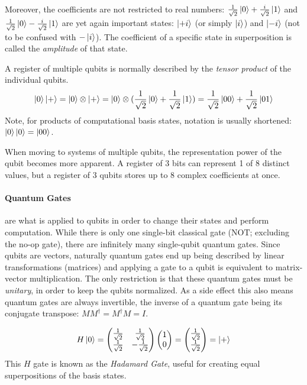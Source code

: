 Moreover, the coefficients are not restricted to real numbers: $\frac{1}{\sqrt2}\ket{0} + \frac{i}{\sqrt2}\ket{1}$ and $\frac{1}{\sqrt2}\ket{0} - \frac{i}{\sqrt2}\ket{1}$
are yet again important states: $\ket{+i}$ (or simply $\ket{i}$) and $\ket{-i}$ (not to be confused with $-\ket{i}$).
The coefficient of a specific state in superposition is called the \emph{amplitude} of that state.

A register of multiple qubits is normally described by the \emph{tensor product} of the individual qubits.
\begin{equation*}
    \ket{0}\ket{+} = \ket{0} \otimes \ket{+} = \ket{0} \otimes (\frac{1}{\sqrt2}\ket{0} + \frac{1}{\sqrt2}\ket{1}) = \frac{1}{\sqrt2}\ket{00} + \frac{1}{\sqrt2}\ket{01}
\end{equation*}
Note, for products of computational basis states, notation is usually shortened: $\ket{0}\ket{0} = \ket{00}$.

When moving to systems of multiple qubits, the representation power of the qubit becomes more apparent.
A register of 3 bits can represent 1 of 8 distinct values, but a register of 3 qubits stores up to 8 complex coefficients at once.

\paragraph*{Quantum Gates}
are what is applied to qubits in order to change their states and perform computation.
While there is only one single-bit classical gate ($\text{NOT}$; excluding the no-op gate), there are infinitely many single-qubit quantum gates.
Since qubits are vectors, naturally quantum gates end up being described by linear transformations (matrices) and applying a gate to a qubit is equivalent to matrix-vector multiplication.
The only restriction is that these quantum gates must be \emph{unitary}, in order to keep the qubits normalized. As a side effect this also means quantum gates are always invertible,
the inverse of a quantum gate being its conjugate transpose: $MM^{\dagger} = M^{\dagger}M = I$.

\begin{equation*}
    H\ket{0} = \begin{pmatrix} \frac{1}{\sqrt{2}}  & \frac{1}{\sqrt{2}}  \\ \frac{1}{\sqrt{2}}  & -\frac{1}{\sqrt{2}}  \end{pmatrix} \begin{pmatrix} 1 \\ 0 \end{pmatrix} = \begin{pmatrix} \frac{1}{\sqrt{2}} \\ \frac{1}{\sqrt{2}} \end{pmatrix} = \ket{+}
\end{equation*}
This $H$ gate is known as the \emph{Hadamard Gate}, useful for creating equal superpositions of the basis states.

